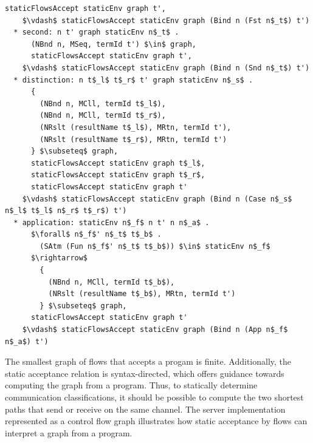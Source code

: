 \documentclass[letterpaper, 11pt]{extarticle}
\begin{document}
\begin{lstlisting}[language=logic, mathescape]
      staticFlowsAccept staticEnv graph t', 
    $\vdash$ staticFlowsAccept staticEnv graph (Bind n (Fst n$_t$) t')
  * second: n t' graph staticEnv n$_t$ .
      (NBnd n, MSeq, termId t') $\in$ graph, 
      staticFlowsAccept staticEnv graph t', 
    $\vdash$ staticFlowsAccept staticEnv graph (Bind n (Snd n$_t$) t')
  * distinction: n t$_l$ t$_r$ t' graph staticEnv n$_s$ .
      {
        (NBnd n, MCll, termId t$_l$),
        (NBnd n, MCll, termId t$_r$),
        (NRslt (resultName t$_l$), MRtn, termId t'),
        (NRslt (resultName t$_r$), MRtn, termId t')
      } $\subseteq$ graph, 
      staticFlowsAccept staticEnv graph t$_l$, 
      staticFlowsAccept staticEnv graph t$_r$,
      staticFlowsAccept staticEnv graph t'
    $\vdash$ staticFlowsAccept staticEnv graph (Bind n (Case n$_s$ n$_l$ t$_l$ n$_r$ t$_r$) t')
  * application: staticEnv n$_f$ n t' n n$_a$ .
      $\forall$ n$_f$' n$_t$ t$_b$ . 
        (SAtm (Fun n$_f$' n$_t$ t$_b$)) $\in$ staticEnv n$_f$ 
      $\rightarrow$
        {
          (NBnd n, MCll, termId t$_b$),
          (NRslt (resultName t$_b$), MRtn, termId t')
        } $\subseteq$ graph,
      staticFlowsAccept staticEnv graph t'
    $\vdash$ staticFlowsAccept staticEnv graph (Bind n (App n$_f$ n$_a$) t')
\end{lstlisting}

The smallest graph of flows that accepts a progam is finite. Additionally, the static
acceptance relation is syntax-directed, which offers guidance towards computing the graph
from a program. Thus, to statically determine communication classifications, it should
be possible to compute the two shortest paths that send or receive on the same channel. 
The server implementation represented as a control flow graph
illustrates how static acceptance by flows can interpret a graph from a program.
\end{document}

